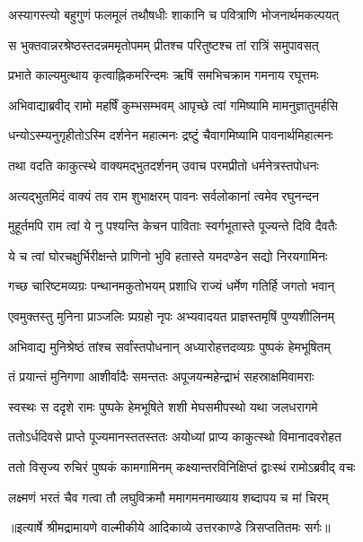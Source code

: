 \twolineshloka
{अस्यागस्त्यो बहुगुणं फलमूलं तथौषधीः}
{शाकानि च पवित्राणि भोजनार्थमकल्पयत्} %

\twolineshloka
{स भुक्तवान्नरश्रेष्ठस्तदन्नममृतोपमम्}
{प्रीतश्च परितुष्टश्च तां रात्रिं समुपावसत्} %

\twolineshloka
{प्रभाते काल्यमुत्थाय कृत्वाह्निकमरिन्दमः}
{ऋषिं समभिचक्राम गमनाय रघूत्तमः} %

\twolineshloka
{अभिवाद्याब्रवीद् रामो महर्षिं कुम्भसम्भवम्}
{आपृच्छे त्वां गमिष्यामि मामनुज्ञातुमर्हसि} %

\twolineshloka
{धन्योऽस्म्यनुगृहीतोऽस्मि दर्शनेन महात्मनः}
{द्रष्टुं चैवागमिष्यामि पावनार्थमिहात्मनः} %

\twolineshloka
{तथा वदति काकुत्स्थे वाक्यमद्भुतदर्शनम्}
{उवाच परमप्रीतो धर्मनेत्रस्तपोधनः} %

\twolineshloka
{अत्यद्भुतमिदं वाक्यं तव राम शुभाक्षरम्}
{पावनः सर्वलोकानां त्वमेव रघुनन्दन} %

\twolineshloka
{मुहूर्तमपि राम त्वां ये नु पश्यन्ति केचन}
{पाविताः स्वर्गभूतास्ते पूज्यन्ते दिवि दैवतैः} %

\twolineshloka
{ये च त्वां घोरचक्षुर्भिरीक्षन्ते प्राणिनो भुवि}
{हतास्ते यमदण्डेन सद्यो निरयगामिनः} %

\twolineshloka
{गच्छ चारिष्टमव्यग्रः पन्थानमकुतोभयम्}
{प्रशाधि राज्यं धर्मेण गतिर्हि जगतो भवान्} %

\twolineshloka
{एवमुक्तस्तु मुनिना प्राञ्जलिः प्र्पग्रहो नृपः}
{अभ्यवादयत प्राज्ञस्तमृषिं पुण्यशीलिनम्} %

\twolineshloka
{अभिवाद्य मुनिश्रेष्ठं तांश्च सर्वांस्तपोधनान्}
{अध्यारोहत्तदव्यग्रः पुष्पकं हेमभूषितम्} %

\twolineshloka
{तं प्रयान्तं मुनिगणा आशीर्वादैः समन्ततः}
{अपूजयन्महेन्द्राभं सहस्राक्षमिवामराः} %

\twolineshloka
{स्वस्थः स ददृशे रामः पुष्पके हेमभूषिते}
{शशी मेघसमीपस्थो यथा जलधरागमे} %

\twolineshloka
{ततोऽर्धदिवसे प्राप्ते पूज्यमानस्ततस्ततः}
{अयोध्यां प्राप्य काकुत्स्थो विमानादवरोहत} %

\twolineshloka
{ततो विसृज्य रुचिरं पुष्पकं कामगामिनम्}
{कक्ष्यान्तरविनिक्षिप्तं द्वाःस्थं रामोऽब्रवीद् वचः} %

\twolineshloka
{लक्ष्मणं भरतं चैव गत्वा तौ लघुविक्रमौ}
{ममागमनमाख्याय शब्दापय च मां चिरम्} %


{॥इत्यार्षे श्रीमद्रामायणे वाल्मीकीये आदिकाव्ये उत्तरकाण्डे त्रिसप्ततितमः सर्गः॥}

